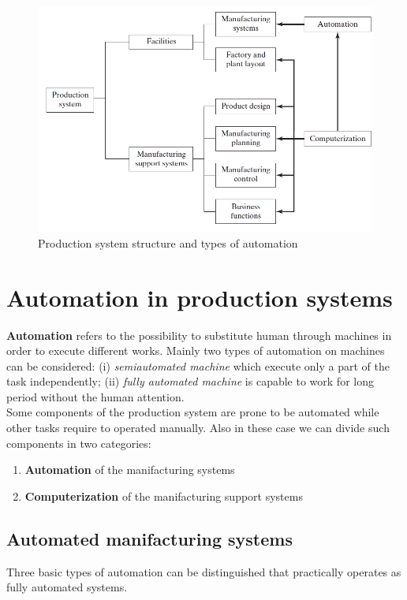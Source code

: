 \begin{figure}
    \centering
    \includegraphics[scale=0.8]{img/prod_system_scheme.png}
    \caption{Production system structure and types of automation}
    \label{fig:prod_sys_structure}
\end{figure}

\section{Automation in production systems}
\textbf{Automation} refers to the possibility to substitute human through machines in order to execute different works. Mainly two types of automation on machines can be considered: (i) \textit{semiautomated machine} which execute only a part of the task independently; (ii) \textit{fully automated machine} is capable to work for long period without the human attention.\\
Some components of the production system are prone to be automated while other tasks require to operated manually. Also in these case we can divide such components in two categories:
\begin{enumerate}
    \itemsep-0.3em
    \item \textsf{\textbf{Automation} of the manifacturing systems}
    \item \textsf{\textbf{Computerization} of the manifacturing support systems}
\end{enumerate}

\subsection{Automated manifacturing systems}
Three basic types of automation can be distinguished that practically operates as fully automated systems.

